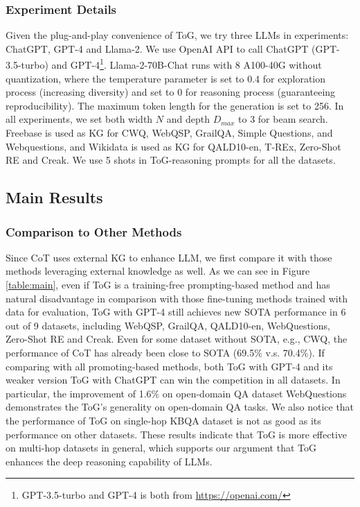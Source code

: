 \documentclass{article} %
\begin{document}
\subsubsection{Experiment Details}
Given the plug-and-play convenience of ToG, we try three LLMs in experiments: ChatGPT, GPT-4 and Llama-2. We use OpenAI API to call ChatGPT (GPT-3.5-turbo) and GPT-4\footnote{GPT-3.5-turbo and GPT-4 is both from \url{https://openai.com/}}. Llama-2-70B-Chat \citep{llama2} runs with 8 A100-40G without quantization, where the temperature parameter is set to 0.4 for exploration process (increasing diversity) and set to 0 for reasoning process (guaranteeing reproducibility). The maximum token length for the generation is set to 256. In all experiments, we set both width $N$ and depth $D_{max}$ to 3 for beam search. Freebase \citep{freebase} is used as KG for CWQ, WebQSP, GrailQA, Simple Questions, and Webquestions, and Wikidata \citep{Wikidata} is used as KG for QALD10-en, T-REx, Zero-Shot RE and Creak. 
We use 5 shots in ToG-reasoning prompts for all the datasets.
\subsection{Main Results}




\subsubsection{Comparison to Other Methods}
\label{sec:main_results}
Since CoT uses external KG to enhance LLM, we first compare it with those methods leveraging external knowledge as well. As we can see in Figure \ref{table:main}, even if ToG is a training-free prompting-based method and has natural disadvantage in comparison with those fine-tuning methods trained with data for evaluation, ToG with GPT-4 still achieves new SOTA performance in 6 out of 9 datasets, including WebQSP, GrailQA, QALD10-en, WebQuestions, Zero-Shot RE and Creak. Even for some dataset without SOTA, e.g., CWQ, the performance of CoT has already been close to SOTA (69.5\% v.s. 70.4\%). If comparing with all promoting-based methods, both ToG with GPT-4 and its weaker version ToG with ChatGPT can win the competition in all datasets. In particular, the improvement of 1.6\% on open-domain QA dataset WebQuestions demonstrates the ToG's generality on open-domain QA tasks. We also notice that the performance of ToG on single-hop KBQA dataset is not as good as its performance on other datasets. These results indicate that ToG is more effective on multi-hop datasets in general, which supports our argument that ToG enhances the deep reasoning capability of LLMs. 
\end{document}
